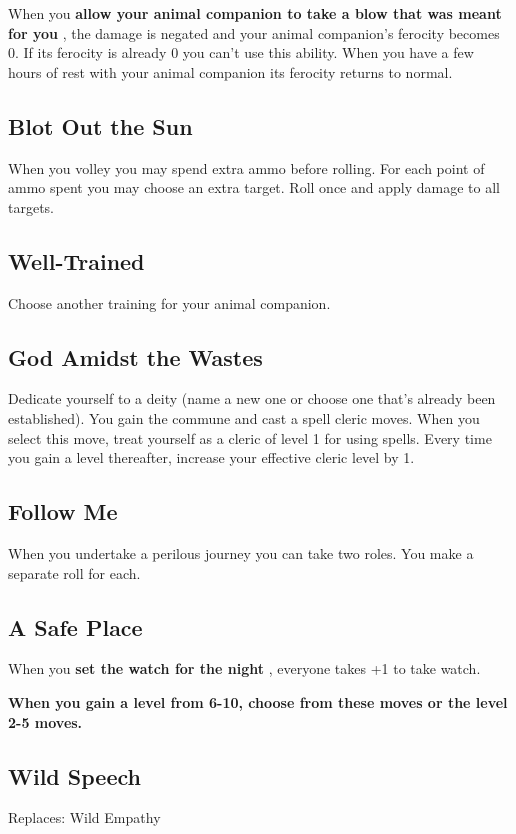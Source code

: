  When you \textbf{allow your animal companion to take a blow that was meant for you}
, the damage is negated and your animal companion's ferocity becomes 0. If its ferocity is already 0 you can't use this ability. When you have a few hours of rest with your animal companion its ferocity returns to normal.
\subsection{Blot Out the Sun}


 When you volley you may spend extra ammo before rolling. For each point of ammo spent you may choose an extra target. Roll once and apply damage to all targets.
\subsection{Well-Trained}


 Choose another training for your animal companion.
\subsection{God Amidst the Wastes}


 Dedicate yourself to a deity (name a new one or choose one that's already been established). You gain the commune and cast a spell cleric moves. When you select this move, treat yourself as a cleric of level 1 for using spells. Every time you gain a level thereafter, increase your effective cleric level by 1.
\subsection{Follow Me}


 When you undertake a perilous journey you can take two roles. You make a separate roll for each.
\subsection{A Safe Place}


 When you \textbf{set the watch for the night}
, everyone takes +1 to take watch.


\vspace{\baselineskip}
 {\bfseries When you gain a level from 6-10, choose from these moves or the level 2-5 moves.}
\subsection{Wild Speech}


 Replaces: Wild Empathy


